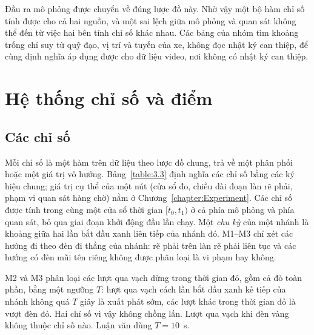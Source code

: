 \documentclass[../main.tex]{subfiles}
\begin{document}
Đầu ra mô phỏng được chuyển về đúng lược đồ này. Nhờ vậy một bộ hàm chỉ số tính được cho cả hai nguồn, và một sai lệch giữa mô phỏng và quan sát không thể đến từ việc hai bên tính chỉ số khác nhau. Các bảng của nhóm tìm khoảng trống chỉ suy từ quỹ đạo, vị trí và tuyến của xe, không đọc nhật ký can thiệp, để cùng định nghĩa áp dụng được cho dữ liệu video, nơi không có nhật ký can thiệp.

\section{Hệ thống chỉ số và điểm}
\label{section:3.7}

\subsection{Các chỉ số}

Mỗi chỉ số là một hàm trên dữ liệu theo lược đồ chung, trả về một phân phối hoặc một giá trị vô hướng. Bảng~\ref{table:3.3} định nghĩa các chỉ số bằng các ký hiệu chung; giá trị cụ thể của một nút (cửa sổ đo, chiều dài đoạn làn rẽ phải, phạm vi quan sát hàng chờ) nằm ở Chương~\ref{chapter:Experiment}. Các chỉ số được tính trong cùng một cửa sổ thời gian $[t_0, t_1)$ ở cả phía mô phỏng và phía quan sát, bỏ qua giai đoạn khởi động đầu lần chạy. Một \emph{chu kỳ} của một nhánh là khoảng giữa hai lần bắt đầu xanh liên tiếp của nhánh đó. M1--M3 chỉ xét các hướng đi theo đèn đi thẳng của nhánh: rẽ phải trên làn rẽ phải liên tục và các hướng có đèn mũi tên riêng không được phân loại là vi phạm hay không.

M2 và M3 phân loại các lượt qua vạch dừng trong thời gian đỏ, gồm cả đỏ toàn phần, bằng một ngưỡng $T$: lượt qua vạch cách lần bắt đầu xanh kế tiếp của nhánh không quá $T$ giây là xuất phát sớm, các lượt khác trong thời gian đỏ là vượt đèn đỏ. Hai chỉ số vì vậy không chồng lấn. Lượt qua vạch khi đèn vàng không thuộc chỉ số nào. Luận văn dùng $T = 10$~s.
\end{document}
